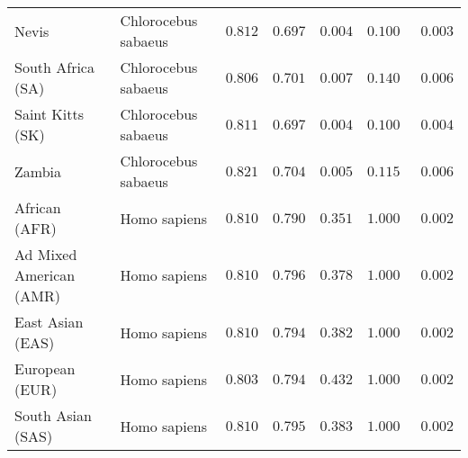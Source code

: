 \begin{center}
\begin{adjustbox}{width = 1\textwidth}
\begin{tabular}{|l|l|r|r|r|r|r|}
            Nevis               & Chlorocebus sabaeus & $ 0.812$ & $ 0.697$ & $ 0.004$ & $ 0.100~~$     & $ 0.003$ \\
            South Africa (SA)                         & Chlorocebus sabaeus & $ 0.806$ & $ 0.701$ & $ 0.007$ & $ 0.140~~$     & $ 0.006$ \\
            Saint Kitts (SK)                  & Chlorocebus sabaeus        & $ 0.811$ & $ 0.697$ & $ 0.004$ & $ 0.100~~$     & $ 0.004$ \\
            Zambia        & Chlorocebus sabaeus        & $ 0.821$ & $ 0.704$ & $ 0.005$ & $ 0.115~~$     & $ 0.006$ \\
            African (AFR)               & Homo sapiens        & $ 0.810$ & $ 0.790$ & $ 0.351$ & $ 1.000~~$     & $ 0.002$ \\
            Ad Mixed American (AMR)                 & Homo sapiens        & $ 0.810$ & $ 0.796$ & $ 0.378$ & $ 1.000~~$     & $ 0.002$ \\
            East Asian (EAS)              & Homo sapiens        & $ 0.810$ & $ 0.794$ & $ 0.382$ & $ 1.000~~$     & $ 0.002$ \\
            European (EUR)              & Homo sapiens        & $ 0.803$ & $ 0.794$ & $ 0.432$ & $ 1.000~~$     & $ 0.002$ \\
            South Asian (SAS)              & Homo sapiens        & $ 0.810$ & $ 0.795$ & $ 0.383$ & $ 1.000~~$     & $ 0.002$ \\
            \bottomrule
        \end{tabular}
    \end{adjustbox}
\end{center}